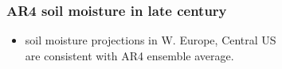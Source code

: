 \begin{frame}
\frametitle{AR4 soil moisture in late \twentyfirst century}

\begin{center}

\vspace*{-1cm}

\end{center}

\vspace*{-1em}
\begin{itemize}

\item \parbox{0.9\textwidth}{\centering%
%
\hadgem soil moisture projections in W. Europe, Central US \\ 
are consistent with AR4 ensemble average. }

\end{itemize}

%
%

\end{frame}

